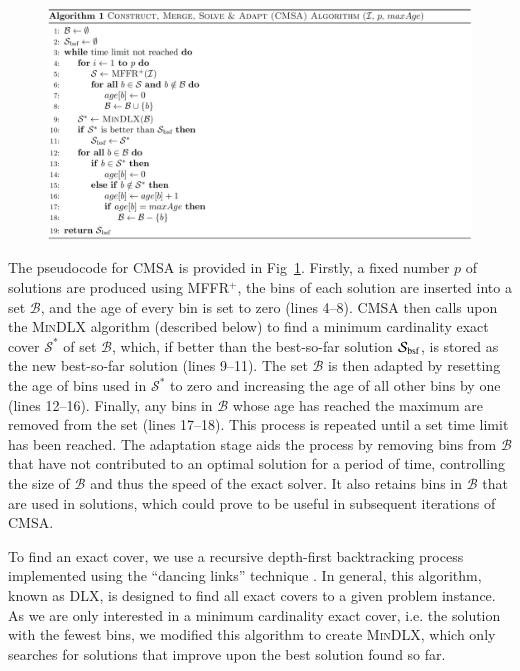 \documentclass[authoryear]{elsarticle}
\begin{document}
\begin{figure}[h!]	
	\centering
	\includegraphics[width=\textwidth]{figures/AlgorithmCMSA}
	\caption{}	
	\label{fig:algcmsa}
\end{figure}

\noindent The pseudocode for CMSA is provided in Fig~\ref{fig:algcmsa}. Firstly, a fixed number $p$ of solutions are produced using MFFR$^+$, the bins of each solution are inserted into a set $\mathcal{B}$, and the age of every bin is set to zero (lines 4--8). CMSA then calls upon the \textsc{MinDLX} algorithm (described below) to find a minimum cardinality exact cover $\mathcal{S}^*$ of set $\mathcal{B}$, which, if better than the best-so-far solution $\mathcal{S}_{\textup{bsf}}$, is stored as the new best-so-far solution (lines 9--11). The set $\mathcal{B}$ is then adapted by resetting the age of bins used in $\mathcal{S}^*$ to zero and increasing the age of all other bins by one (lines 12--16). Finally, any bins in $\mathcal{B}$ whose age has reached the maximum are removed from the set (lines 17--18). This process is repeated until a set time limit has been reached. The adaptation stage aids the process by removing bins from $\mathcal{B}$ that have not contributed to an optimal solution for a period of time, controlling the size of $\mathcal{B}$ and thus the speed of the exact solver. It also retains bins in $\mathcal{B}$ that are used in solutions, which could prove to be useful in subsequent iterations of CMSA.

To find an exact cover, we use a recursive depth-first backtracking process implemented using the ``dancing links'' technique \citep{knuth2000}. In general, this algorithm, known as DLX, is designed to find all exact covers to a given problem instance. As we are only interested in a minimum cardinality exact cover, i.e. the solution with the fewest bins, we modified this algorithm to create \textsc{MinDLX}, which only searches for solutions that improve upon the best solution found so far.
\end{document}
